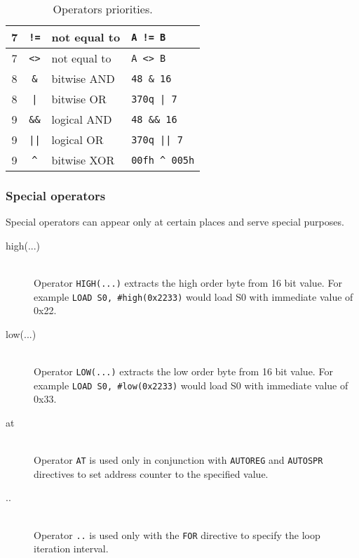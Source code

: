 \begin{table}[h!]
\begin{tabular}{|c|c|l|l|}
                7        & \texttt{!=}   & not equal to            & \texttt{A != B}           \\\hline
                7        & \texttt{<>}   & not equal to            & \texttt{A <> B}           \\\hline
                8        & \texttt{\&}   & bitwise AND             & \texttt{48 \& 16}          \\\hline
                8        & \texttt{|}    & bitwise OR              & \texttt{370q | 7}          \\\hline
                9        & \texttt{\&\&} & logical AND             & \texttt{48 \&\& 16}        \\\hline
                9        & \texttt{||}   & logical OR              & \texttt{370q || 7}         \\\hline
                9        & \texttt{\^{}} & bitwise XOR             & \texttt{00fh \^{} 005h}    \\\hline
            \end{tabular}
            \caption{Operators priorities.}
        \end{table}

        \subsubsection{Special operators}
            Special operators can appear only at certain places and serve special purposes.
            \begin{description}
                \item[high(...)]~\\
                    Operator \texttt{HIGH(...)} extracts the high order byte from 16 bit value. For example \texttt{LOAD  S0, \#high(0x2233)} would load S0 with immediate value of 0x22.
                \item[low(...)]~\\
                    Operator \texttt{LOW(...)} extracts the low order byte from 16 bit value. For example \texttt{LOAD  S0, \#low(0x2233)} would load S0 with immediate value of 0x33.
                \item[at]~\\
                    Operator \texttt{AT} is used only in conjunction with \texttt{AUTOREG} and \texttt{AUTOSPR} directives to set address counter to the specified value.
                \item[..]~\\
                    Operator \texttt{..} is used only with the \texttt{FOR} directive to specify the loop iteration interval.
            \end{description}

